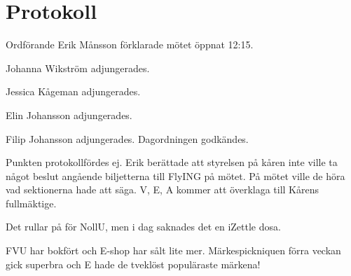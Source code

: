 \documentclass[10pt]{article}
\def\mo{Erik Månsson}
\begin{document}
\section*{Protokoll}
\begin{paragrafer}
Ordförande {\mo} förklarade mötet öppnat 12:15.

{\valavmo}

{\valavms}

{\valavj}

{\tosg}

Johanna Wikström adjungerades.

Jessica Kågeman adjungerades.

Elin Johansson adjungerades.

Filip Johansson adjungerades.
Dagordningen godkändes.


\begin{fyllnadsval} %
\end{fyllnadsval}

\begin{paragrafer}
Punkten protokollfördes ej.
Erik berättade att styrelsen på kåren inte ville ta något beslut angående biljetterna till FlyING på mötet. På mötet ville de höra vad sektionerna hade att säga. V, E, A kommer att överklaga till Kårens fullmäktige.

Det rullar på för NollU, men i dag saknades det en iZettle dosa.

FVU har bokfört och E-shop har sålt lite mer. Märkespickniquen förra veckan gick superbra och E hade de tveklöst populäraste märkena!


\end{paragrafer}
\end{paragrafer}
\end{document}
